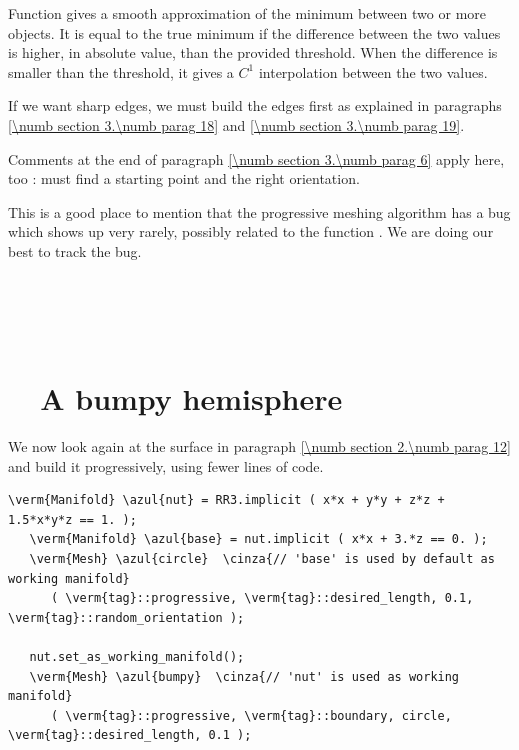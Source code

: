 Function {\small\tt {}} gives a smooth approximation of the minimum between
two or more {\small\tt {}} objects.
It is equal to the true minimum if the difference between the two values is higher, in
absolute value, than the provided threshold.
When the difference is smaller than the threshold, it gives a $ C^1 $ interpolation between
the two values.

If we want sharp edges, we must build the edges first as explained in paragraphs
\ref{\numb section 3.\numb parag 18} and \ref{\numb section 3.\numb parag 19}.

Comments at the end of paragraph \ref{\numb section 3.\numb parag 6} apply here, too :
{\maniFEM} must find a starting point and the right orientation.

This is a good place to mention that the progressive meshing algorithm has a bug
which shows up very rarely, possibly related to the function {\small\tt {}}.
We are doing our best to track the bug.


\section{~~\cinza{[empty]}}\label{\numb section 3.\numb parag 8}


\section{~~A bumpy hemisphere}\label{\numb section 3.\numb parag 9}

We now look again at the surface in paragraph \ref{\numb section 2.\numb parag 12}
and build it progressively, using fewer lines of code.

\begin{Verbatim}[commandchars=\\\{\},formatcom=\small\tt,
   baselinestretch=0.94,framesep=2mm                      ]
   \verm{Manifold} \azul{nut} = RR3.implicit ( x*x + y*y + z*z + 1.5*x*y*z == 1. );
   \verm{Manifold} \azul{base} = nut.implicit ( x*x + 3.*z == 0. );
   \verm{Mesh} \azul{circle}  \cinza{// 'base' is used by default as working manifold}
      ( \verm{tag}::progressive, \verm{tag}::desired_length, 0.1, \verm{tag}::random_orientation );
   
   nut.set_as_working_manifold();
   \verm{Mesh} \azul{bumpy}  \cinza{// 'nut' is used as working manifold}
      ( \verm{tag}::progressive, \verm{tag}::boundary, circle, \verm{tag}::desired_length, 0.1 );
\end{Verbatim}


